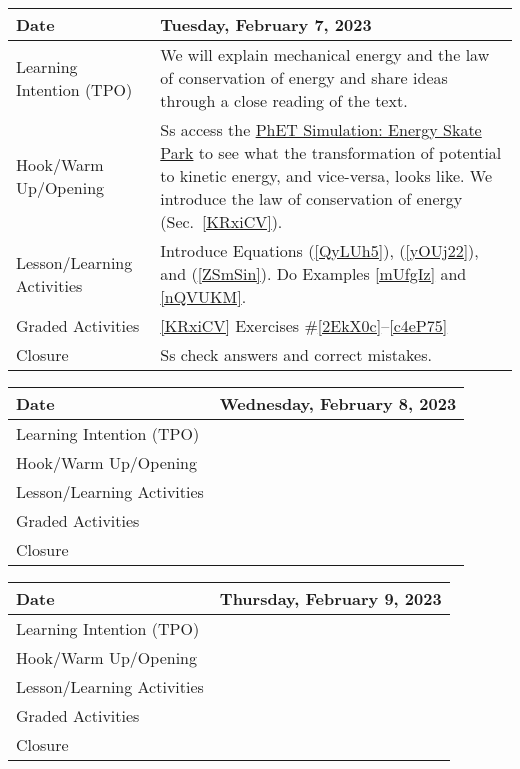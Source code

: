 \documentclass[main.tex]{subfiles}
\begin{document}
\begin{tabular}{|m{}|m{}|}
    \hline  
    \cellcolor{black!20}\textbf{Date} &
    \cellcolor{black!20}\textbf{Tuesday, February 7, 2023} \\
    \hline
    Learning Intention (TPO) &  We will explain mechanical energy and the law of conservation of energy and share ideas through a close reading of the text.\\
    \hline
    Hook/Warm Up/Opening & Ss access the \href{https://phet.colorado.edu/en/simulations/energy-skate-park}{PhET Simulation: Energy Skate Park} to see what the transformation of potential to kinetic energy, and vice-versa, looks like. We introduce the \gls{law of conservation of energy} (Sec.~\ref{KRxiCV}). \\
    \hline
    Lesson/Learning Activities & Introduce Equations (\ref{QyLUh5}), (\ref{yOUj22}), and (\ref{ZSmSin}). Do Examples \ref{mUfgIz} and \ref{nQVUKM}.\\
    \hline
    Graded Activities & \ref{KRxiCV} Exercises \#\ref{2EkX0c}--\ref{c4eP75}\\
    \hline
    Closure & Ss check answers and correct mistakes.\\  
    \hline
\end{tabular} 

\begin{tabular}{|m{}|m{}|}
    \hline  
    \cellcolor{black!20}\textbf{Date} &
    \cellcolor{black!20}\textbf{Wednesday, February 8, 2023} \\
    \hline
    Learning Intention (TPO) &  \\
    \hline
    Hook/Warm Up/Opening & \\
    \hline
    Lesson/Learning Activities & \\
    \hline
    Graded Activities & \\
    \hline
    Closure & \\  
    \hline
\end{tabular} 

\begin{tabular}{|m{}|m{}|}
    \hline  
    \cellcolor{black!20}\textbf{Date} &
    \cellcolor{black!20}\textbf{Thursday, February 9, 2023} \\
    \hline
    Learning Intention (TPO) & \\
    \hline
    Hook/Warm Up/Opening & \\
    \hline
    Lesson/Learning Activities & \\
    \hline
    Graded Activities &  \\
    \hline
    Closure & \\  
    \hline
\end{tabular}
\end{document}
